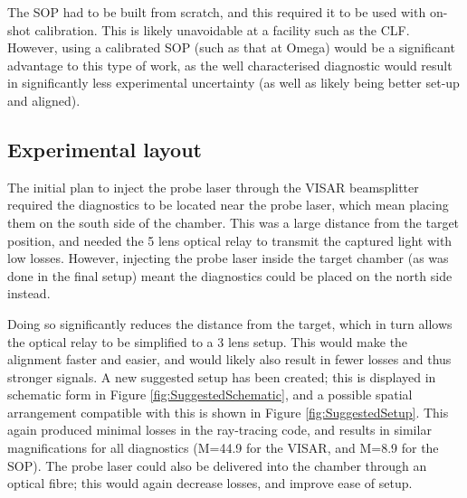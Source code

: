 The SOP had to be built from scratch, and this required it to be used with on-shot calibration. This is likely unavoidable at a facility such as the CLF. However, using a calibrated SOP (such as that at Omega) would be a significant advantage to this type of work, as the well characterised diagnostic would result in significantly less experimental uncertainty (as well as likely being better set-up and aligned).

\subsection{Experimental layout}

The initial plan to inject the probe laser through the VISAR beamsplitter required the diagnostics to be located near the probe laser, which mean placing them on the south side of the chamber. This was a large distance from the target position, and needed the 5 lens optical relay to transmit the captured light with low losses. However, injecting the probe laser inside the target chamber (as was done in the final setup) meant the diagnostics could be placed on the north side instead.

Doing so significantly reduces the distance from the target, which in turn allows the optical relay to be simplified to a 3 lens setup. This would make the alignment faster and easier, and would likely also result in fewer losses and thus stronger signals. A new suggested setup has been created; this is displayed in schematic form in Figure \ref{fig:SuggestedSchematic}, and a possible spatial arrangement compatible with this is shown in Figure \ref{fig:SuggestedSetup}. This again produced minimal losses in the ray-tracing code, and results in similar magnifications for all diagnostics (M=44.9 for the VISAR, and M=8.9 for the SOP). The probe laser could also be delivered into the chamber through an optical fibre; this would again decrease losses, and improve ease of setup.

